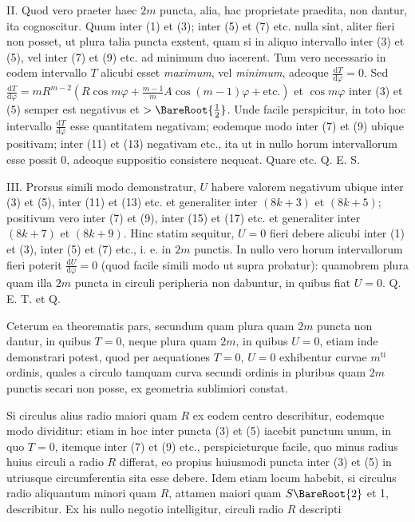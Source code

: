 II. Quod vero praeter haec $2m$ puncta, alia, hac proprietate praedita, non dantur, ita cognoscitur. Quum inter (1) et (3); inter (5) et (7) etc. nulla sint, aliter fieri non posset, ut plura talia puncta exstent, quam si in aliquo intervallo inter (3) et (5), vel inter (7) et (9) etc. ad minimum duo iacerent. Tum vero necessario in eodem intervallo $T$ alicubi esset \textit{maximum}, vel \textit{minimum}, adeoque $\frac{\mathrm dT}{\mathrm d\varphi}=0$. Sed $\frac{\mathrm dT}{\mathrm d\varphi}=mR^{m-2}(R\cos m\varphi+\frac{m-1}mA\cos(m-1)\varphi+\text{etc.})$ et $\cos m\varphi$ inter (3) et (5) semper est negativus et $>\BareRoot{\frac12}$. Unde facile perspicitur, in toto hoc intervallo $\frac{\mathrm dT}{\mathrm d\varphi}$ esse quantitatem negativam; eodemque modo inter (7) et (9) ubique positivam; inter (11) et (13) negativam etc., ita ut in nullo horum intervallorum esse possit 0, adeoque suppositio consistere nequeat. Quare etc. Q. E. S.

III. Prorsus simili modo demonstratur, $U$ habere valorem negativum ubique inter (3) et (5), inter (11) et (13) etc. et generaliter inter $(8k+3)$ et $(8k+5)$; positivum vero inter (7) et (9), inter (15) et (17) etc. et generaliter inter $(8k+7)$ et $(8k+9)$. Hinc statim sequitur, $U=0$ fieri debere alicubi inter (1) et (3), inter (5) et (7) etc., i. e. in $2m$ punctis. In nullo vero horum intervallorum fieri poterit $\frac{\mathrm dU}{\mathrm d\varphi}=0$ (quod facile simili modo ut supra probatur): quamobrem plura quam illa $2m$ puncta in circuli peripheria non dabuntur, in quibus fiat $U=0$. Q. E. T. et Q.

Ceterum ea theorematis pars, secundum quam plura quam $2m$ puncta non dantur, in quibus $T=0$, neque plura quam $2m$, in quibus $U=0$, etiam inde demonstrari potest, quod per aequationes $T=0$, $U=0$ exhibentur curvae $m^{\mathrm{ti}}$ ordinis, quales a circulo tamquam curva secundi ordinis in pluribus quam $2m$ punctis secari non posse, ex geometria sublimiori constat.

 Si circulus alius radio maiori quam $R$ ex eodem centro describitur, eodemque modo dividitur: etiam in hoc inter puncta (3) et (5) iacebit punctum unum, in quo $T=0$, itemque inter (7) et (9) etc., perspicieturque facile, quo minus radius huius circuli a radio $R$ differat, eo propius huiusmodi puncta inter (3) et (5) in utriusque circumferentia sita esse debere. Idem etiam locum habebit, si circulus radio aliquantum minori quam $R$, attamen maiori quam $S\BareRoot{2}$ et 1, describitur. Ex his nullo negotio intelligitur, circuli radio $R$ descripti
